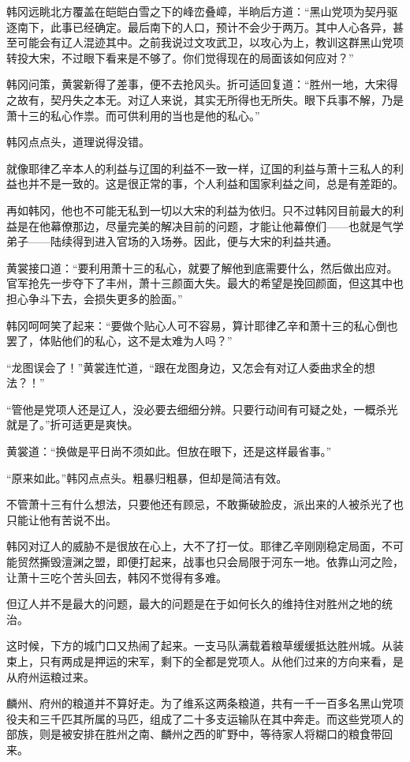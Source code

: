 韩冈远眺北方覆盖在皑皑白雪之下的峰峦叠嶂，半晌后方道：“黑山党项为契丹驱逐南下，此事已经确定。最后南下的人口，预计不会少于两万。其中人心各异，甚至可能会有辽人混迹其中。之前我说过文攻武卫，以攻心为上，教训这群黑山党项转投大宋，不过眼下看来是不够了。你们觉得现在的局面该如何应对？”

韩冈问策，黄裳新得了差事，便不去抢风头。折可适回复道：“胜州一地，大宋得之故有，契丹失之本无。对辽人来说，其实无所得也无所失。眼下兵事不解，乃是萧十三的私心作祟。而可供利用的当也是他的私心。”

韩冈点点头，道理说得没错。

就像耶律乙辛本人的利益与辽国的利益不一致一样，辽国的利益与萧十三私人的利益也并不是一致的。这是很正常的事，个人利益和国家利益之间，总是有差距的。

再如韩冈，他也不可能无私到一切以大宋的利益为依归。只不过韩冈目前最大的利益是在他幕僚那边，尽量完美的解决目前的问题，才能让他幕僚们——也就是气学弟子——陆续得到进入官场的入场券。因此，便与大宋的利益共通。

黄裳接口道：“要利用萧十三的私心，就要了解他到底需要什么，然后做出应对。官军抢先一步夺下了丰州，萧十三颜面大失。最大的希望是挽回颜面，但这其中也担心争斗下去，会损失更多的脸面。”

韩冈呵呵笑了起来：“要做个贴心人可不容易，算计耶律乙辛和萧十三的私心倒也罢了，体贴他们的私心，这不是太难为人吗？”

“龙图误会了！”黄裳连忙道，“跟在龙图身边，又怎会有对辽人委曲求全的想法？！”

“管他是党项人还是辽人，没必要去细细分辨。只要行动间有可疑之处，一概杀光就是了。”折可适更是爽快。

黄裳道：“换做是平日尚不须如此。但放在眼下，还是这样最省事。”

“原来如此。”韩冈点点头。粗暴归粗暴，但却是简洁有效。

不管萧十三有什么想法，只要他还有顾忌，不敢撕破脸皮，派出来的人被杀光了也只能让他有苦说不出。

韩冈对辽人的威胁不是很放在心上，大不了打一仗。耶律乙辛刚刚稳定局面，不可能贸然撕毁澶渊之盟，即便打起来，战事也只会局限于河东一地。依靠山河之险，让萧十三吃个苦头回去，韩冈不觉得有多难。

但辽人并不是最大的问题，最大的问题是在于如何长久的维持住对胜州之地的统治。

这时候，下方的城门口又热闹了起来。一支马队满载着粮草缓缓抵达胜州城。从装束上，只有两成是押运的宋军，剩下的全都是党项人。从他们过来的方向来看，是从府州运粮过来。

麟州、府州的粮道并不算好走。为了维系这两条粮道，共有一千一百多名黑山党项役夫和三千匹其所属的马匹，组成了二十多支运输队在其中奔走。而这些党项人的部族，则是被安排在胜州之南、麟州之西的旷野中，等待家人将糊口的粮食带回来。

